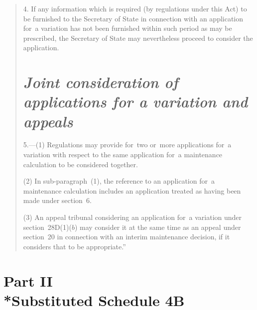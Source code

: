 \documentclass[12pt,a4paper]{article}
\begin{document}
\begin{quotation}
4. If any information which is required (by regulations under this Act) to be furnished to the Secretary of State in connection with an application for~a variation has not been furnished within such period as may be prescribed, the Secretary of State may nevertheless proceed to consider the application.

\section*{\itshape Joint consideration of applications for a variation and appeals}

5.---(1) Regulations may provide for~two or~more applications for~a variation with respect to the same application for~a maintenance calculation to be considered together.

(2) In sub-paragraph~(1), the reference to an application for~a maintenance calculation includes an application treated as having been made under section~6. 

(3) An appeal tribunal considering an application for~a variation under section~28D(1)($b$)  may consider it at the same time as an appeal under section~20 in connection with an interim maintenance decision, if it considers that to be appropriate.”
\end{quotation}

\section[Part II --- Substituted Schedule 4B]{Part II\\*Substituted Schedule 4B}

\renewcommand\parthead{--- Schedule 2 Part II}
\end{document}
